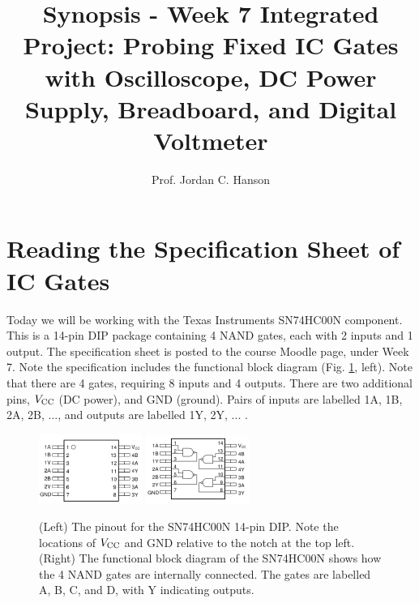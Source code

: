 \documentclass{article}
\begin{document}
\title{Synopsis - Week 7 Integrated Project: Probing Fixed IC Gates with Oscilloscope, DC Power Supply, Breadboard, and Digital Voltmeter}
\author{Prof. Jordan C. Hanson}

\maketitle

\section{Reading the Specification Sheet of IC Gates}
\label{sec:spec}

Today we will be working with the Texas Instruments SN74HC00N component.  This is a 14-pin DIP package containing 4 NAND gates, each with 2 inputs and 1 output.  The specification sheet is posted to the course Moodle page, under Week 7.  Note the specification includes the functional block diagram (Fig. \ref{fig:count1}, left).  Note that there are 4 gates, requiring 8 inputs and 4 outputs.  There are two additional pins, $V_{\rm CC}$ (DC power), and GND (ground).  Pairs of inputs are labelled 1A, 1B, 2A, 2B, ..., and outputs are labelled 1Y, 2Y, ... .

\begin{figure}[ht]
\centering
\includegraphics[width=0.3\textwidth]{4NAND_2.png} \hspace{1cm}
\includegraphics[width=0.3\textwidth]{4NAND.png}
\caption{\label{fig:count1} (Left)  The pinout for the SN74HC00N 14-pin DIP.  Note the locations of $V_{\rm CC}$ and GND relative to the notch at the top left.  (Right)  The functional block diagram of the SN74HC00N shows how the 4 NAND gates are internally connected.  The gates are labelled A, B, C, and D, with Y indicating outputs.}
\end{figure}
\end{document}
